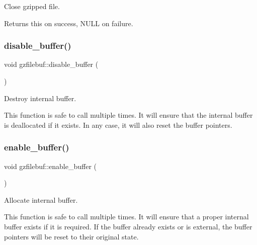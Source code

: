 Close gzipped file. 

\begin{DoxyReturn}{Returns}
{\ttfamily this} on success, N\+U\+LL on failure. 
\end{DoxyReturn}
\mbox{\label{classgzfilebuf_a8a0be757572b305a44ec3d02dbf8c54c}} 
\subsubsection{\texorpdfstring{disable\+\_\+buffer()}{disable\_buffer()}}
{\footnotesize\ttfamily void gzfilebuf\+::disable\+\_\+buffer (\begin{DoxyParamCaption}{ }\end{DoxyParamCaption})\hspace{0.3cm}{\ttfamily [private]}}



Destroy internal buffer. 

This function is safe to call multiple times. It will ensure that the internal buffer is deallocated if it exists. In any case, it will also reset the buffer pointers. \mbox{\label{classgzfilebuf_ad2dfb62b88b6d4f03bc268e660ad6712}} 
\subsubsection{\texorpdfstring{enable\+\_\+buffer()}{enable\_buffer()}}
{\footnotesize\ttfamily void gzfilebuf\+::enable\+\_\+buffer (\begin{DoxyParamCaption}{ }\end{DoxyParamCaption})\hspace{0.3cm}{\ttfamily [private]}}



Allocate internal buffer. 

This function is safe to call multiple times. It will ensure that a proper internal buffer exists if it is required. If the buffer already exists or is external, the buffer pointers will be reset to their original state. \mbox{\label{classgzfilebuf_ac8e1bd83de7533320523fa91ad3355d7}} 
